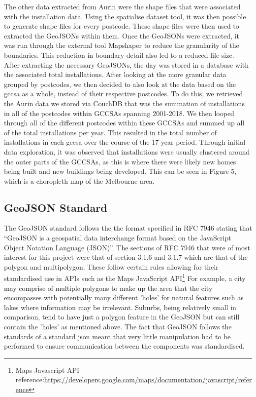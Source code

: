 \documentclass[11pt, oneside]{article}
\begin{document}
The other data extracted from Aurin were the shape files that were associated with the installation data. Using the spatialise dataset tool, it was then possible to generate shape files for every postcode. These shape files were then used to extracted the GeoJSONs within them. Once the GeoJSONs were extracted, it was run through the external tool Mapshaper \citep{mapshaper} to reduce the granularity of the boundaries. This reduction in boundary detail also led to a reduced file size. After extracting the necessary GeoJSONs, the day was stored in a database with the associated total installations.
\newline
\newline
After looking at the more granular data grouped by postcodes, we then decided to also look at the data based on the \acrshort{gccsa} as a whole, instead of their respective postcodes. To do this, we retrieved the Aurin data we stored via CouchDB that was the summation of installations in all of the postcodes within GCCSAs spanning 2001-2018. We then looped through all of the different postcodes within these GCCSAs and summed up all of the total installations per year. This resulted in the total number of installations in each \acrshort{gccsa} over the course of the 17 year period. 
\newline
\newline
Through initial data exploration, it was observed that installations were usually clustered around the outer parts of the GCCSAs, as this is where there were likely new homes being built and new buildings being developed. This can be seen in Figure 5, which is a choropleth map of the Melbourne area.

\subsection{GeoJSON Standard}
\label{sec:geojson_standard}
The GeoJSON standard follows the the format specified in RFC 7946 \citep{rfc7946} stating that \enquote{GeoJSON is a geospatial data interchange format based on the JavaScript Object Notation Language (JSON)}. The sections of RFC 7946 that were of most interest for this project were that of section 3.1.6 and 3.1.7 which are that of the polygon and multipolygon. These follow certain rules allowing for their standardised use in APIs such as the Maps JavaScript API\footnote{Maps Javascript API reference:\url{https://developers.google.com/maps/documentation/javascript/reference}}
\newline
\newline
For example, a city may comprise of multiple polygons to make up the area that the city encompasses with potentially many different 'holes' for natural features such as lakes where information may be irrelevant. Suburbs, being relatively small in comparison, tend to have just a polygon feature in the GeoJSON but can still contain the 'holes' as mentioned above.
\newline
\newline
The fact that GeoJSON follows the standards of a standard \acrshort{json} meant that very little manipulation had to be performed to ensure communication between the components was standardised.
\end{document}
